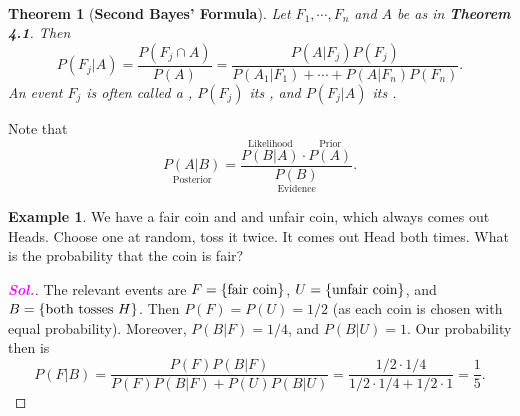 \documentclass[12pt,a4paper]{article}
\newtheorem{theorem}{Theorem}[section]
\theoremstyle{definition}
\newtheorem{example}{Example}[section]
\theoremstyle{definition}
\theoremstyle{definition}
\theoremstyle{definition}
\theoremstyle{remark}
\theoremstyle{definition}
\newcommand{\sol}{\textcolor{magenta}{\bf \textit{Sol.}}\quad}
\begin{document}
\
\begin{tcolorbox}[colback=white]
	\begin{theorem}[\bf Second Bayes' Formula]
		Let $F_1,\cdots,F_n$ and $A$ be as in \textbf{Theorem 4.1}. Then \[
		P(F_j|A)=\frac{P(F_j\cap A)}{P(A)}=\frac{P(A|F_j)P(F_j)}{P(A_1|F_1)+\cdots+P(A|F_n)P(F_n)}.
		\] An event $F_j$ is often called a \text{\normalfont\bf hypothesis}, $P(F_j)$ its , and $P(F_j|A)$ its .
	\end{theorem}
\end{tcolorbox} Note that \[
\underset{\text{Posterior}}{P(A|B)}=\frac{\overset{\text{Likelihood}}{P(B|A)}\cdot\overset{\text{Prior}}{P(A)}}{\underset{\text{Evidence}}{P(B)}}.
\]

\begin{example}
	We have a fair coin and and unfair coin, which always comes out Heads. Choose one at random, toss it twice. It comes out Head both times. What is the probability that the coin is fair?
	\begin{proof}[\sol]
		The relevant events are $F=\set{\text{fair coin}}$, $U=\set{\text{unfair coin}}$, and $B=\set{\text{both tosses}\ H}$. Then $P(F)=P(U)=1/2$ (as each coin is chosen with equal probability). Moreover, $P(B|F)=1/4$, and $P(B|U)=1$. Our probability then is \[
		P(F|B)=\frac{P(F)P(B|F)}{P(F)P(B|F)+P(U)P(B|U)}=\frac{1/2\cdot 1/4}{1/2\cdot1/4+1/2\cdot1}=\frac{1}{5}.
		\]
	\end{proof}
\end{example}
\
\end{document}
